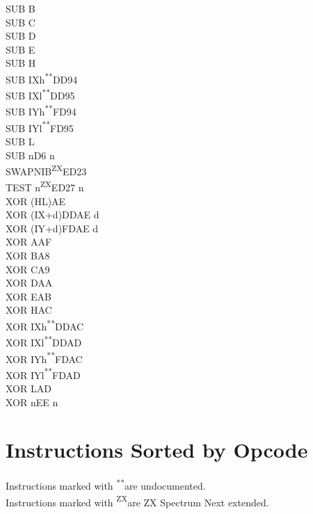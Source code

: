 \documentclass[twoside,openright,a4paper]{book}
\newcommand{\UNDOC}{\textnormal{\textsuperscript{**}}}
\newcommand{\ZXN}{\textnormal{\textsuperscript{ZX}}}
\begin{document}
\begin{multicols}{3}
{\begin{tabbing}
	SUB B\\
	SUB C\\
	SUB D\\
	SUB E\\
	SUB H\\
	SUB IXh\UNDOC\>DD94\\
	SUB IXl\UNDOC\>DD95\\
	SUB IYh\UNDOC\>FD94\\
	SUB IYl\UNDOC\>FD95\\
	SUB L\\
	SUB n\>D6 n\\
	SWAPNIB\ZXN\>ED23\\
	TEST n\ZXN\>ED27 n\\
	XOR (HL)\>AE\\
	XOR (IX+d)\>DDAE d\\
	XOR (IY+d)\>FDAE d\\
	XOR A\>AF\\
	XOR B\>A8\\
	XOR C\>A9\\
	XOR D\>AA\\
	XOR E\>AB\\
	XOR H\>AC\\
	XOR IXh\UNDOC\>DDAC\\
	XOR IXl\UNDOC\>DDAD\\
	XOR IYh\UNDOC\>FDAC\\
	XOR IYl\UNDOC\>FDAD\\
	XOR L\>AD\\
	XOR n\>EE n

	\end{tabbing}
}
\end{multicols}
\normalsize


\chapter{Instructions Sorted by Opcode}

Instructions marked with \UNDOC are undocumented.\\
Instructions marked with \ZXN are ZX Spectrum Next extended.
\end{document}
